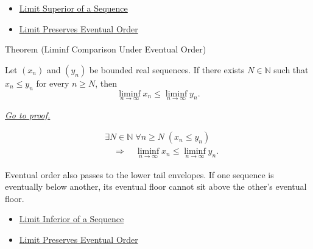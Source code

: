 \begin{remark*}[Dependencies]\hfill
\begin{itemize}
  \item \hyperref[def:limsup-sequence]{Limit Superior of a Sequence}
  \item \hyperref[thm:limit-preserves-eventual-order]{Limit Preserves Eventual Order}
\end{itemize}
\end{remark*}


\begin{theorembox}{Theorem (Liminf Comparison Under Eventual Order)}
\begin{theorem}
\label{thm:liminf-comparison-under-eventual-order}
Let $(x_n)$ and $(y_n)$ be bounded real sequences. If there exists
$N\in\mathbb{N}$ such that $x_n\le y_n$ for every $n\ge N$, then
\[
  \liminf_{n\to\infty}x_n
  \le
  \liminf_{n\to\infty}y_n.
\]

\smallskip
\noindent
\hyperref[prf:liminf-comparison-under-eventual-order]{\textit{Go to proof.}}
\end{theorem}
\end{theorembox}

\begin{remark*}
\[
\begin{aligned}
&\exists N\in\mathbb{N}\;\forall n\ge N\;(x_n\le y_n)\\
&\quad\Longrightarrow\quad
\liminf_{n\to\infty}x_n
\le
\liminf_{n\to\infty}y_n.
\end{aligned}
\]
\end{remark*}

\begin{remark*}[Interpretation]
Eventual order also passes to the lower tail envelopes. If one sequence is
eventually below another, its eventual floor cannot sit above the other's
eventual floor.
\end{remark*}

\begin{remark*}[Dependencies]\hfill
\begin{itemize}
  \item \hyperref[def:liminf-sequence]{Limit Inferior of a Sequence}
  \item \hyperref[thm:limit-preserves-eventual-order]{Limit Preserves Eventual Order}
\end{itemize}
\end{remark*}

